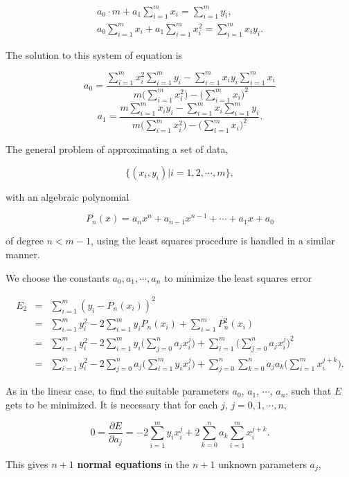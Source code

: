 \documentclass[preprint,12pt]{elsarticle}
\begin{document}
\[
\begin{array}{c}
  a_0\cdot m +a_1\sum\limits_{i=1}^{m}x_i=\sum\limits_{i=1}^{m}y_i,\\
  a_0\sum\limits_{i=1}^{m}x_i+a_1\sum\limits_{i=1}^{m}x_i^2=\sum\limits_{i=1}^{m}x_iy_i.
\end{array}
\]

The solution to this system of equation is

\[
a_0=\frac{\sum\limits_{i=1}^{m}x_i^2\sum\limits_{i=1}^{m}y_i-\sum\limits_{i=1}^{m}x_i y_i\sum\limits_{i=1}^{m}x_i}
{m\biggl(\sum\limits_{i=1}^{m}x_i^2\biggr)-\biggl(\sum\limits_{i=1}^{m}x_i\biggr)^2}
\]
\[
a_1=\frac{m\sum\limits_{i=1}^{m}x_iy_i-\sum\limits_{i=1}^{m}x_i\sum\limits_{i=1}^{m}y_i}
{m\biggl(\sum\limits_{i=1}^{m}x_i^2\biggr)-\biggl(\sum\limits_{i=1}^{m}x_i\biggr)^2}.
\]

The general problem of approximating a set of data, 

$$\{(x_i, y_i)| i=1,2,\cdots,m\},$$

with an algebraic polynomial

\[
P_n(x) = a_nx^n + a_{n-1}x^{n-1}+\cdots + a_1x + a_0
\]

of degree $n < m - 1$, using the least squares procedure is handled in a similar manner.

We choose the constants $a_0,a_1,\cdots,a_n$ to minimize the least squares error

\begin{eqnarray*}
    E_2 &=& \sum_{i=1}^{m}(y_i-P_n(x_i))^2 \\
        &=& \sum_{i=1}^{m}y_i^2-2\sum_{i=1}^{m}y_iP_n(x_i)+\sum_{i=1}^{m}P_n^2(x_i)\\
        &=& \sum_{i=1}^{m}y_i^2-2\sum_{i=1}^{m}y_i\biggl(\sum_{j=0}^{n}a_jx_i^j\biggr)
        +\sum_{i=1}^{m}\biggl(\sum_{j=0}^{n}a_jx_i^j\biggr)^2 \\
        &=& \sum_{i=1}^{m}y_i^2-2\sum_{j=0}^{n}a_j\biggl(\sum_{i=1}^my_ix_i^j\biggr)
        +\sum_{j=0}^{n}\sum_{k=0}^{n}a_ja_k\biggl(\sum_{i=1}^{m}x_i^{j+k}\biggr).
\end{eqnarray*}

As in the linear case, to find the suitable parameters $a_0$, $a_1$, $\cdots$, $a_n$, such that $E$ gets to be minimized. It is necessary that for each $j$, $j=0,1,\cdots,n$,

\[
0=\frac{\partial E}{\partial
a_j}=-2\sum_{i=1}^{m}y_ix_i^j+2\sum_{k=0}^{n}a_k\sum_{i=1}^{m}x_i^{j+k}.
\]

This gives $n + 1$ \textbf{normal equations} in the $n+1$ unknown parameters $a_j$,
\end{document}
